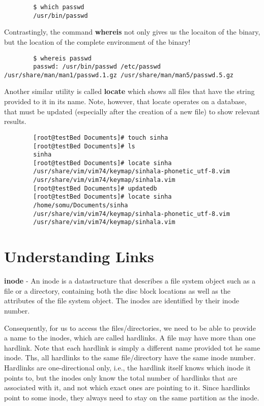 \documentclass{report}
\begin{document}
	\begin{verbatim}
		$ which passwd
		/usr/bin/passwd
	\end{verbatim}
	
	\noindent
	Contrastingly, the command \textbf{whereis} not only gives us the locaiton of the binary, but the location of the complete environment of the binary!
	
	\begin{verbatim}
		$ whereis passwd
		passwd: /usr/bin/passwd /etc/passwd /usr/share/man/man1/passwd.1.gz /usr/share/man/man5/passwd.5.gz
	\end{verbatim}

	\noindent
	Another similar utility is called \textbf{locate} which shows all files that have the string provided to it in its name. Note, however, that locate operates on a database, that must be updated (especially after the creation of a new file) to show relevant results. 
	
	\begin{verbatim}
		[root@testBed Documents]# touch sinha
		[root@testBed Documents]# ls
		sinha
		[root@testBed Documents]# locate sinha
		/usr/share/vim/vim74/keymap/sinhala-phonetic_utf-8.vim
		/usr/share/vim/vim74/keymap/sinhala.vim
		[root@testBed Documents]# updatedb
		[root@testBed Documents]# locate sinha
		/home/somu/Documents/sinha
		/usr/share/vim/vim74/keymap/sinhala-phonetic_utf-8.vim
		/usr/share/vim/vim74/keymap/sinhala.vim
	\end{verbatim}
	
	\section{Understanding Links}
	\textbf{inode} - An inode is a datastructure that describes a file system object such as a file or a directory, containing both the disc block locations as well as the attributes of the file system object. The inodes are identified by their inode number.
	
	\noindent
	Consequently, for us to access the files/directories, we need to be able to provide a name to the inodes, which are called hardlinks. A file may have more than one hardlink. Note that each hardlink is simply a different name provided tot he same inode. Ths, all hardlinks to the same file/directory have the same inode number. Hardlinks are one-directional only, i.e., the hardlink itself knows which inode it points to, but the inodes only know the total number of hardlinks that are associated with it, and not which exact ones are pointing to it. Since hardlinks point to some inode, they always need to stay on the same partition as the inode.
	
\end{document}
